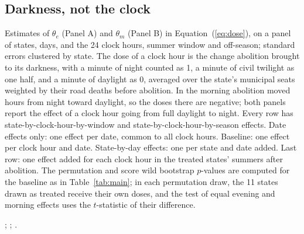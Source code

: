 \subsection{Darkness, not the clock}\label{sec:dose-results}

\begin{table}[tbp]
  \caption{Darkness as a Dose}
  \label{tab:dose}
  \centering\footnotesize\setlength{\tabcolsep}{5pt}
  
  \begin{tablenotes}[Notes]
  Estimates of $\theta_e$ (Panel A) and $\theta_m$ (Panel B) in Equation~(\ref{eq:dose}), on a panel of states, days, and the 24 clock hours, summer window and off-season; standard errors clustered by state. The dose of a clock hour is the change abolition brought to its darkness, with a minute of night counted as 1, a minute of civil twilight as one half, and a minute of daylight as 0, averaged over the state's municipal seats weighted by their road deaths before abolition. In the morning abolition moved hours from night toward daylight, so the doses there are negative; both panels report the effect of a clock hour going from full daylight to night. Every row has state-by-clock-hour-by-window and state-by-clock-hour-by-season effects. Date effects only: one effect per date, common to all clock hours. Baseline: one effect per clock hour and date. State-by-day effects: one per state and date added. Last row: one effect added for each clock hour in the treated states' summers after abolition. The permutation and score wild bootstrap $p$-values are computed for the baseline as in Table~\ref{tab:main}; in each permutation draw, the 11 states drawn as treated receive their own doses, and the test of equal evening and morning effects uses the $t$-statistic of their difference.
  \end{tablenotes}
  \begin{tablenotes}[Sources]
  \citet{datasus2025sim}; \citet{prf2025dados}; \citet{noaa2025solar}.
  \end{tablenotes}
\end{table}

